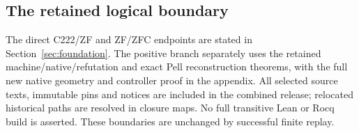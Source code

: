 \subsection{The retained logical boundary}
The direct C222/ZF and ZF/ZFC endpoints are stated in
Section~\ref{sec:foundation}. The positive branch separately uses the
retained machine/native/refutation and exact Pell reconstruction theorems,
with the full new native geometry and controller proof in the appendix.
All selected source texts, immutable pins and notices are included in
the combined release; relocated historical paths are resolved in closure
maps. No full transitive Lean or Rocq build is asserted. These boundaries
are unchanged by successful finite replay.

